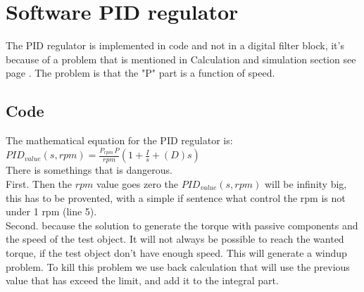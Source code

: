 \newpage
\section{Software PID regulator}

The PID regulator is implemented in code and not in a digital filter block, it's because of a problem that is mentioned in Calculation and simulation section see page \pageref{sec:Calculation_and_Simulation}. The problem is that the "P" part is a function of speed.\\

\subsection{Code}

The mathematical equation for the PID regulator is:\\   

$ PID_{value} \left( s,rpm \right) = {\frac {P_{rpm}\,P}{rpm} \left( 1+{\frac {I}{s}}+ \left( D \right) s \right) } $\\

There is somethings that is dangerous. \\ 
First. Then the $ rpm $ value goes zero the $  PID_{value} \left( s,rpm \right) $ will be infinity big, this has to be provented, with a simple if sentence what control the rpm is not under 1 rpm (line 5). \\
Second. because the solution to generate the torque with passive components and the speed of the test object. It will not always be possible to reach the wanted torque, if the test object don't have enough speed. This will generate a windup problem. To kill this problem we use back calculation that will use the previous value that has exceed the limit, and add it to the integral part. 


